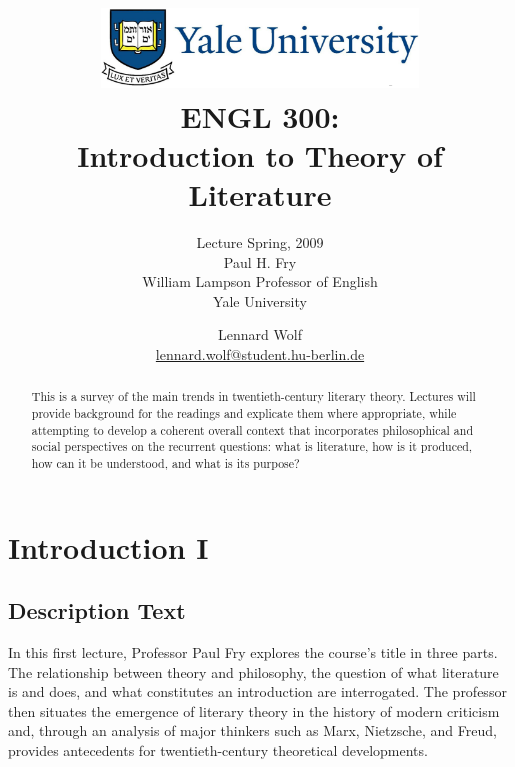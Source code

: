 \documentclass[]{scrartcl}
\begin{document}
\title{
	\includegraphics*[width=0.63\textwidth]{images/yale_logo.png}\\
	\vspace{24pt}
	ENGL 300:\\Introduction to Theory of Literature}
\subtitle{Lecture Spring, 2009\\
          Paul H. Fry\\
          William Lampson Professor of English \\ 
          Yale University}
\author{Lennard Wolf\\
        \href{mailto:lennard.wolf@student.hu-berlin.de}{lennard.wolf@student.hu-berlin.de}}
\maketitle
\begin{abstract}

This is a survey of the main trends in twentieth-century literary theory. Lectures will provide background for the readings and explicate them where appropriate, while attempting to develop a coherent overall context that incorporates philosophical and social perspectives on the recurrent questions: what is literature, how is it produced, how can it be understood, and what is its purpose?

\end{abstract}
\newpage

\tableofcontents

\listoffigures
\newpage


\section{Introduction I}


\subsection{Description Text}
\vspace{15pt}

In this first lecture, Professor Paul Fry explores the course's title in three parts. The relationship between theory and philosophy, the question of what literature is and does, and what constitutes an introduction are interrogated. The professor then situates the emergence of literary theory in the history of modern criticism and, through an analysis of major thinkers such as Marx, Nietzsche, and Freud, provides antecedents for twentieth-century theoretical developments.
\end{document}
